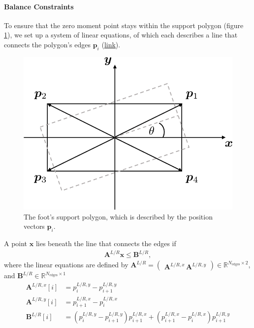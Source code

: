 \paragraph{Balance Constraints} 
To ensure that the zero moment point stays within the support polygon (figure \ref{fig::312_foot_hull}), we set up a system of linear equations, of which each describes a line that connects the polygon's edges $\bm{p}_i$ (\href{https://github.com/mhubii/nmpc_pattern_generator/blob/5a213044c927dc6aac9f7e32ce1e5fb472cd67bb/libs/pattern_generator/src/base_generator.cpp#L844}{\underline{link}}). 
\begin{figure}[h!]
	\centering
	\includegraphics[scale=.5]{chapters/03_background/img/foot_convex_hull.png}
	\caption{The foot's support polygon, which is described by the position vectors $\bm{p}_i$.}
	\label{fig::312_foot_hull}
\end{figure}
A point $\bm{x}$ lies beneath the line that connects the edges if
\begin{align}
	\bm{A}^{L/R}\bm{x} \leq \bm{B}^{L/R},
	\label{eq::312_lin}
\end{align}
where the linear equations are defined by  $\bm{A}^{L/R}=\begin{pmatrix}
\bm{A}^{L/R,x}\,\bm{A}^{L/R,y}\end{pmatrix}\in\mathbb{R}^{N_{\text{edges}}\times2}$, and $\bm{B}^{L/R}\in\mathbb{R}^{N_{\text{edges}}\times1}$
\begin{align}
	\bm{A}^{L/R,x}[i] &= p^{L/R,y}_i-p^{L/R,y}_{i+1} \\
	\bm{A}^{L/R,y}[i] &= p^{L/R,x}_{i+1}-p^{L/R,x}_i \\
	\bm{B}^{L/R}[i] &= (p^{L/R,y}_i-p^{L/R,y}_{i+1})p^{L/R,x}_{i+1} + (p^{L/R,x}_{i+1}-p^{L/R,x}_i)p^{L/R,y}_{i+1}
\end{align}
